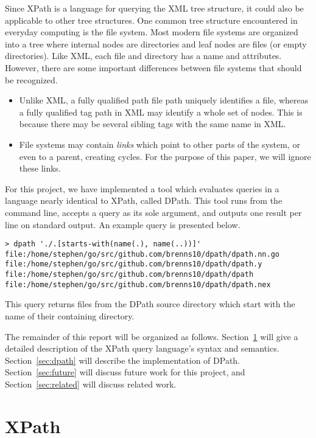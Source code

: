 \documentclass{scrartcl}
\begin{document}
Since XPath is a language for querying the XML tree structure, it could also be
applicable to other tree structures. One common tree structure encountered in
everyday computing is the file system. Most modern file systems are organized
into a tree where internal nodes are directories and leaf nodes are files (or
empty directories). Like XML, each file and directory has a name and attributes.
However, there are some important differences between file systems that should
be recognized.

\begin{itemize}
\item Unlike XML, a fully qualified path file path uniquely identifies a file,
  whereas a fully qualified tag path in XML may identify a whole set of nodes.
  This is because there may be several sibling tags with the same name in XML.
\item File systems may contain \emph{links} which point to other parts of the
  system, or even to a parent, creating cycles. For the purpose of this paper,
  we will ignore these links.
\end{itemize}

For this project, we have implemented a tool which evaluates queries in a
language nearly identical to XPath, called DPath. This tool runs from the
command line, accepts a query as its sole argument, and outputs one result per
line on standard output. An example query is presented below.

\begin{lstlisting}
> dpath './.[starts-with(name(.), name(..))]'
file:/home/stephen/go/src/github.com/brenns10/dpath/dpath.nn.go
file:/home/stephen/go/src/github.com/brenns10/dpath/dpath.y
file:/home/stephen/go/src/github.com/brenns10/dpath/dpath
file:/home/stephen/go/src/github.com/brenns10/dpath/dpath.nex
\end{lstlisting}

This query returns files from the DPath source directory which start with the
name of their containing directory.

The remainder of this report will be organized as follows.
Section~\ref{sec:xpath} will give a detailed description of the XPath query
language's syntax and semantics. Section~\ref{sec:dpath} will describe the
implementation of DPath. Section~\ref{sec:future} will discuss future work for
this project, and Section~\ref{sec:related} will discuss related work.

\section{XPath}
\label{sec:xpath}
\end{document}
